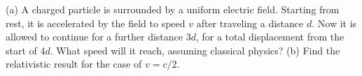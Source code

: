 (a) A charged particle is surrounded by a uniform electric field.
Starting from rest, it is accelerated by the field to speed $v$ after
traveling a distance $d$. Now it is allowed to continue for a further
distance $3d$, for a total displacement from the start of $4d$.
What speed will it reach,
assuming classical physics?\hwendpart
(b) Find the relativistic result for the case of $v=c/2$.
